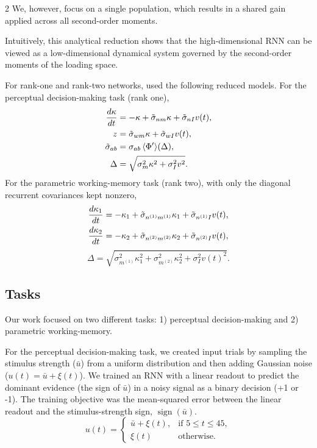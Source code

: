\documentclass[10pt]{article}
\begin{document}
\begin{multicols}{2}
We, however, focus on a single population, which results in a shared gain applied across all second-order moments.

Intuitively, this analytical reduction shows that the high-dimensional RNN can be viewed as a low-dimensional dynamical system governed by the second-order moments of the loading space.

For rank-one and rank-two networks, \citet{dubreuil2022} used the following reduced models. For the perceptual decision-making task (rank one),
\begin{align}
\frac{d\kappa}{dt}
&=-\kappa+\tilde{\sigma}_{nm}\kappa
+\tilde{\sigma}_{nI}v(t), \notag\\
z
&=\tilde{\sigma}_{wm}\kappa
+\tilde{\sigma}_{wI}v(t), \notag\\
\tilde{\sigma}_{ab}
&=\sigma_{ab}\,\langle\Phi'\rangle(\Delta), \notag\\
\Delta
&=\sqrt{\sigma_m^{2}\kappa^{2}+\sigma_I^{2}v^{2}}.
\end{align}
For the parametric working-memory task (rank two), with only the diagonal recurrent covariances kept nonzero,
\begin{align}
\frac{d\kappa_1}{dt}
&=-\kappa_1
+\tilde{\sigma}_{n^{(1)}m^{(1)}}\kappa_1
+\tilde{\sigma}_{n^{(1)}I}v(t), \notag\\
\frac{d\kappa_2}{dt}
&=-\kappa_2
+\tilde{\sigma}_{n^{(2)}m^{(2)}}\kappa_2
+\tilde{\sigma}_{n^{(2)}I}v(t),
\end{align}
\begin{equation}
\Delta
=\sqrt{
\sigma_{m^{(1)}}^{2}\kappa_1^{2}
+\sigma_{m^{(2)}}^{2}\kappa_2^{2}
+\sigma_I^{2}v(t)^{2}
}.
\end{equation}

\subsection{Tasks}

Our work focused on two different tasks: 1) perceptual decision-making and 2) parametric working-memory.

For the perceptual decision-making task, we created input trials by sampling the stimulus strength ($\bar{u}$) from a uniform distribution and then adding Gaussian noise ($u(t)=\bar{u}+\xi(t)$). We trained an RNN with a linear readout to predict the dominant evidence (the sign of $\bar{u}$) in a noisy signal as a binary decision (+1 or -1). The training objective was the mean-squared error between the linear readout and the stimulus-strength sign, $\operatorname{sign}(\bar{u})$.
\begin{equation}
u(t)=
\begin{cases}
\bar{u}+\xi(t), & \text{if } 5\le t\le 45,\\
\xi(t) & \text{otherwise.}
\end{cases}
\end{equation}


\end{multicols}
\end{document}
